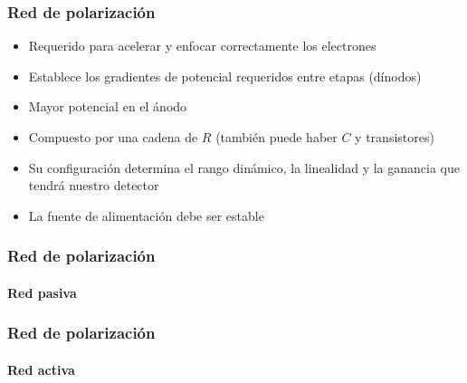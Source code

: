 \documentclass{beamer}
\begin{document}
\begin{frame}
\frametitle{Red de polarizaci\'on}
\begin{itemize}
\item Requerido para acelerar y enfocar correctamente los electrones
\item Establece los gradientes de potencial requeridos entre etapas (d\'inodos) 
\item {\color{blue}Mayor potencial en el \'anodo}
\item Compuesto por una cadena de $R$ (tambi\'en puede haber $C$ y transistores)
\item {\color{blue}Su configuraci\'on determina el rango din\'amico, la linealidad y la ganancia
que tendr\'a nuestro detector}
\item La fuente de alimentaci\'on debe ser estable
\end{itemize}
\begin{center}
\end{center}
\end{frame}

\begin{frame}
\frametitle{Red de polarizaci\'on}
\framesubtitle{Red pasiva}
\end{frame}

\begin{frame}
\frametitle{Red de polarizaci\'on}
\framesubtitle{Red activa}
\begin{center}
\end{center}
\end{frame}
\end{document}

